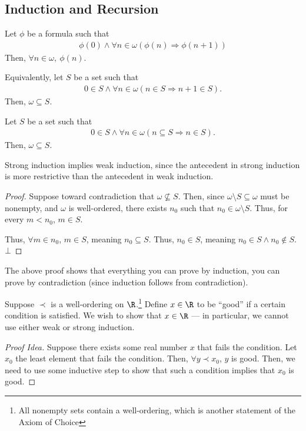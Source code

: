 \documentclass[10pt]{mypackage}
\begin{document}
\subsection{Induction and Recursion}%
\begin{definition}
  Let $\phi$ be a formula such that
  \begin{align*}
    \phi(0) \wedge \forall n\in \omega\left(\phi(n)\Rightarrow \phi\left(n+1\right)\right)
  \end{align*}
  Then, $\forall n\in \omega,~\phi(n)$.\newline

  Equivalently, let $S$ be a set such that
  \begin{align*}
    0\in S \wedge \forall n\in\omega\left(n\in S \Rightarrow n+1\in S\right).
  \end{align*}
  Then, $\omega \subseteq S$.
\end{definition}
\begin{definition}
  Let $S$ be a set such that
  \begin{align*}
    0\in S \wedge \forall n\in \omega \left(n\subseteq S \Rightarrow n\in S\right).
  \end{align*}
  Then, $\omega \subseteq S$.
\end{definition}
\begin{remark}
  Strong induction implies weak induction, since the antecedent in strong induction is more restrictive than the antecedent in weak induction.
\end{remark}
\begin{proof}
  Suppose toward contradiction that $\omega \nsubseteq S$. Then, since $\omega \setminus S\subseteq \omega$ must be nonempty, and $\omega$ is well-ordered, there exists $n_0$ such that $n_0 \in \omega \setminus S$. Thus, for every $m < n_0$, $m\in S$.\newline

  Thus, $\forall m\in n_0$, $m\in S$, meaning $n_0 \subseteq S$. Thus, $n_0\in S$, meaning $n_0\in S\wedge n_0\notin S$. $\bot$
\end{proof}
\begin{remark}
  The above proof shows that everything you can prove by induction, you can prove by contradiction (since induction follows from contradiction).
\end{remark}
\begin{example}
  Suppose $\prec$ is a well-ordering on $\R$.\footnote{All nonempty sets contain a well-ordering, which is another statement of the Axiom of Choice} Define $x\in \R$ to be ``good'' if a certain condition is satisfied. We wish to show that $x\in \R$ --- in particular, we cannot use either weak or strong induction.
  \begin{proof}[Proof Idea]
    Suppose there exists some real number $x$ that fails the condition. Let $x_0$ the least element that fails the condition. Then, $\forall y\prec x_0$, $y$ is good. Then, we need to use some inductive step to show that such a condition implies that $x_0$ is good.
  \end{proof}
\end{example}
\end{document}
